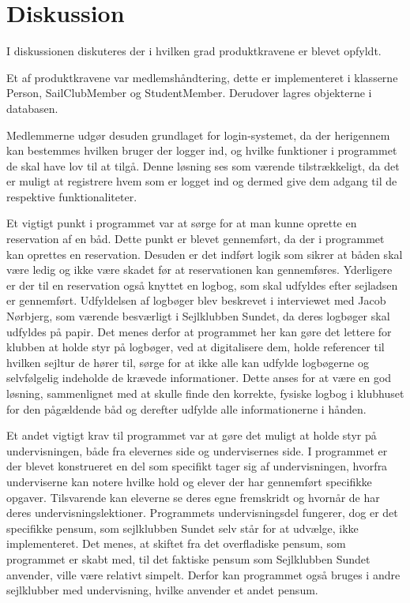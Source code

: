 \chapter{Diskussion}

I diskussionen diskuteres der i hvilken grad produktkravene er blevet opfyldt.

Et af produktkravene var medlemshåndtering, dette er implementeret i klasserne Person, SailClubMember og StudentMember. 
Derudover lagres objekterne i databasen. 

Medlemmerne udgør desuden grundlaget for login-systemet, da der herigennem kan bestemmes hvilken bruger der logger ind, og hvilke funktioner i programmet de skal have lov til at tilgå.  
Denne løsning ses som værende tilstrækkeligt, da det er muligt at registrere hvem som er logget ind og dermed give dem adgang til de respektive funktionaliteter. 

Et vigtigt punkt i programmet var at sørge for at man kunne oprette en reservation af en båd. 
Dette punkt er blevet gennemført, da der i programmet kan oprettes en reservation. 
Desuden er det indført logik som sikrer at båden skal være ledig og ikke være skadet før at reservationen kan gennemføres. 
Yderligere er der til en reservation også knyttet en logbog, som skal udfyldes efter sejladsen er gennemført. 
Udfyldelsen af logbøger blev beskrevet i interviewet med Jacob Nørbjerg, som værende besværligt i Sejlklubben Sundet, da deres logbøger skal udfyldes på papir. 
Det menes derfor at programmet her kan gøre det lettere for klubben at holde styr på logbøger, ved at digitalisere dem, holde referencer til hvilken sejltur de hører til, sørge for at ikke alle kan udfylde logbøgerne og selvfølgelig indeholde de krævede informationer. 
Dette anses for at være en god løsning, sammenlignet med at skulle finde den korrekte, fysiske logbog i klubhuset for den pågældende båd og derefter udfylde alle informationerne i hånden. 


Et andet vigtigt krav til programmet var at gøre det muligt at holde styr på undervisningen, både fra elevernes side og undervisernes side. 
I programmet er der blevet konstrueret en del som specifikt tager sig af undervisningen, hvorfra underviserne kan notere hvilke hold og elever der har gennemført specifikke opgaver.
Tilsvarende kan eleverne se deres egne fremskridt og hvornår de har deres undervisningslektioner.
Programmets undervisningsdel fungerer, dog er det specifikke pensum, som sejlklubben Sundet selv står for at udvælge, ikke implementeret. 
Det menes, at skiftet fra det overfladiske pensum, som programmet er skabt med, til det faktiske pensum som Sejlklubben Sundet anvender, ville være relativt simpelt. 
Derfor kan programmet også bruges i andre sejlklubber med undervisning, hvilke anvender et andet pensum.

